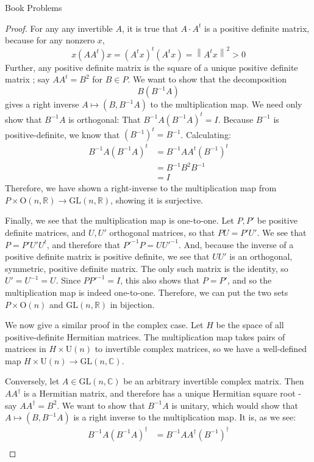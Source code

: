 \documentclass[12pt]{article}
\newcommand{\R}{\mathbb{R}}
\newcommand{\C}{\mathbb{C}}
\theoremstyle{definition}
\begin{document}
\begin{section}{Book Problems}
\begin{proof}
	\par For any any invertible $A$, it is true that $A \cdot A^t$ is a positive definite matrix, because for any nonzero $x$, 
	\[x(AA^t)x = (A^tx)^t(A^tx) = \left \lVert { A^t x } \right \lVert^{2} > 0\]
	Further, any positive definite matrix is the square of a unique positive definite matrix \cite{lax}; say $AA^t = B^2$ for $B \in P$.  We want to show that the decomposition
	\[B(B^{-1}A)\]
	gives a right inverse $A \mapsto (B, B^{-1} A)$ to the multiplication map. We need only show that $B^{-1}A$ is orthogonal: That $B^{-1}A(B^{-1}A)^t = I$. Because $B^{-1}$ is positive-definite, we know that $(B^{-1})^t = B^{-1}$. Calculating:
\begin{align*}
	B^{-1}A(B^{-1}A)^t &= B^{-1}AA^t(B^{-1})^t\\
	&= B^{-1}B^2B^{-1}\\
	&= I
\end{align*}
Therefore, we have shown a right-inverse to the multiplication map from $P \times \text{O}(n, \R) \to \text{GL}(n, \R)$, showing it is surjective.
\par Finally, we see that the multiplication map is one-to-one. Let $P, P'$ be positive definite matrices, and $U, U'$ orthogonal matrices, so that $PU = P'U'$. We see that $P = P'U'U^t$, and therefore that $P'^{-1}P = UU'^{-1}$. And, because the inverse of a positive definite matrix is positive definite, we see that $UU'$ is an orthogonal, symmetric, positive definite matrix. The only such matrix is the identity, so $U' = U^{-1} = U$. Since $PP'^{-1} = I$, this also shows that $P = P'$, and so the multiplication map is indeed one-to-one. Therefore, we can put the two sets $P \times \text{O}(n)$ and $\text{GL}(n, \R)$ in bijection.
	\par We now give a similar proof in the complex case. Let $H$ be the space of all positive-definite Hermitian matrices. The multiplication map takes pairs of matrices in $H \times \text{U}(n)$ to invertible complex matrices, so we have a well-defined map $H \times \text{U}(n) \to \text{GL}(n, \C)$. 
	\par Conversely, let $A \in \text{GL}(n, \C)$ be an arbitrary invertible complex matrix. Then $AA^\dagger$ is a Hermitian matrix, and therefore has a unique Hermitian square root - say $AA^\dagger = B^2$. We want to show that $B^{-1}A$ is unitary, which would show that $A \mapsto (B, B^{-1}A)$ is a right inverse to the multiplication map. It is, as we see:
	\begin{align*}
		B^{-1}A(B^{-1}A)^\dagger &= B^{-1}AA^{\dagger}(B^{-1})^\dagger\\

\end{align*}
\end{proof}
\end{section}
\end{document}

